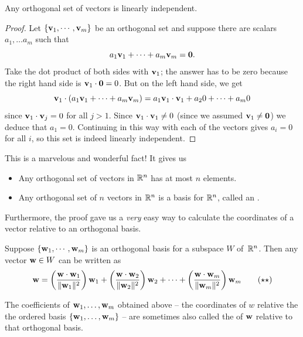 \begin{theorem}\label{theorem:orthogLI}
Any orthogonal set of  vectors is linearly independent.
\end{theorem}

\begin{proof}
Let $\{\mathbf{v}_1, \cdots, \mathbf{v}_m\}$ be an orthogonal set and 
suppose there are scalars $a_1, \dots a_m$ such that
$$
a_1\mathbf{v}_1 + \cdots + a_m\mathbf{v}_m = \mathbf{0}.
$$
Take the dot product of both sides with $\mathbf{v}_1$; the answer has to 
be zero because the right hand side is $\mathbf{v}_1 \cdot \mathbf{0} = 0$.  But on the left hand
side, we get
$$
\mathbf{v}_1 \cdot (a_1\mathbf{v}_1 + \cdots + a_m\mathbf{v}_m) = a_1 \mathbf{v}_1 \cdot \mathbf{v}_1 + a_2 0 + \cdots +a_m 0
$$
since $\mathbf{v}_1 \cdot \mathbf{v}_j = 0$ for all $j>1$.  Since $\mathbf{v}_1 \cdot \mathbf{v}_1 \neq 0$
(since we assumed $\mathbf{v}_1 \neq \mathbf{0}$) we deduce that $a_1 = 0$.
Continuing in this way with each of the vectors gives $a_i=0$ for
all $i$, so this set is indeed linearly independent.
\end{proof}

This is a marvelous and wonderful fact!  
It gives us
\begin{itemize}
\item Any orthogonal set of   vectors in $\mathbb{R}^n$ has at most $n$ elements.
\item  Any orthogonal set of $n$  vectors in $\mathbb{R}^n$ is a basis for $\mathbb{R}^n$, called an .
\end{itemize}
Furthermore, the proof gave us a  {\it very} easy way to calculate the
coordinates of a vector relative to an orthogonal basis.

\begin{theorem}\label{expansion}
Suppose $\{\mathbf{w}_1, \cdots, \mathbf{w}_m\}$ is an orthogonal basis for a subspace $W$ of  $\,\mathbb{R}^n$.
Then any vector $\mathbf{w} \in W$ can be written as
\begin{equation*}
\mathbf{w} = \left( \frac{  \mathbf{w} \cdot\mathbf{w}_1}{\Vert \mathbf{w}_1 \Vert^2} \right) \mathbf{w}_1 +
  \left( \frac{\mathbf{w} \cdot\mathbf{w}_2}{\Vert \mathbf{w}_2 \Vert^2} \right) \mathbf{w}_2 + \cdots +
 \left( \frac{\mathbf{w} \cdot\mathbf{w}_m}{\Vert \mathbf{w}_m \Vert^2} \right) \mathbf{w}_m
 \tag{$\star\star$}\label{expand} \end{equation*}
\end{theorem}

The coefficients of $\mathbf{w}_1, \dots, \mathbf{w}_m$ obtained above -- the coordinates of $w$ relative the the ordered basis $\{\mathbf{w}_1, \dots, \mathbf{w}_m \}$ -- are sometimes also called the  of $\mathbf{w}$ relative to that orthogonal basis.

